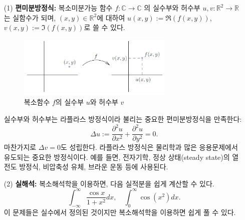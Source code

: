 \begin{itemize}
\item[(1)] {\bf 편미분방정식:}  복소미분가능 함수 $f:\mathbb C \to \mathbb C$ 의 
실수부와 허수부 $u,v: \mathbb R^2 \to \mathbb R\,$는 실함수가 되며, 
$(x,y)\in \mathbb R^2$에 대하여 $u(x,y) := \Re(f(x,y))$, $v(x,y):=\Im(f(x,y))$로 쓸 수 있다.

\begin{figure}[!h]
\begin{center}
\includegraphics[width=0.7\textwidth]{./SaltChapter/figs/preface-fig-0-2}
\end{center}
\label{fig:0.2}
\caption{복소함수 $f$의 실수부 $u$와 허수부 $v$}
\end{figure}

실수부와 허수부는 라플라스 방정식이라 불리는 중요한 편미분방정식을 만족한다:
$$
\Delta u := \frac{\partial^2 u}{\partial x^2} + \frac{\partial^2 u}{\partial y^2} = 0.
$$
마찬가지로 $\Delta v=0$도 성립한다.
라플라스 방정식은 물리학과 많은 응용문제에서 유도되는 중요한 방정식이다.
예를 들면, 전자기학, 정상 상태(steady state)의 열전도 방정식, 
비압축성 유체, 브라운 운동 등에 사용된다.

\item[(2)] {\bf 실해석:} 복소해석학을 이용하면, 다음 실적분을  쉽게 계산할 수 있다.
$$
\int_{-\infty}^\infty \frac{\cos x}{1+x^2}dx, 
\quad
\int_0^\infty \cos(x^2)dx.
$$
이 문제들은 실수에서 정의된 것이지만 복소해석학을 이용하면 쉽게 풀 수 있다.



\end{itemize}
